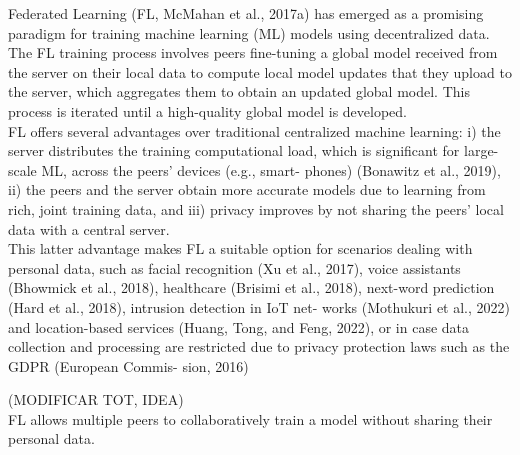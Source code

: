 Federated Learning (FL, McMahan et al., 2017a) has emerged as a promising 
paradigm for training machine learning (ML) models using decentralized data. \\
The FL training process involves peers fine-tuning a global model received from 
the server on their local data to compute local model updates that they upload to the 
server, which aggregates them to obtain an updated global model. This process is iterated 
until a high-quality global model is developed.\\
FL offers several advantages over traditional centralized machine learning: 
i) the server distributes the training computational load, which is significant for 
large-scale ML, across the peers’ devices (e.g., smart- phones) (Bonawitz et al., 2019), 
ii) the peers and the server obtain more accurate models due to learning from rich, joint 
training data, and iii) privacy improves by not sharing the peers’ local data with a 
central server.\\
This latter advantage makes FL a suitable option for scenarios
dealing with personal data, such as facial recognition (Xu et al., 2017), voice assistants
 (Bhowmick et al., 2018), healthcare (Brisimi et al., 2018), next-word prediction 
 (Hard et al., 2018), intrusion detection in IoT net- works (Mothukuri et al., 2022) 
 and location-based services (Huang, Tong, and Feng, 2022), or in case data collection and 
 processing are restricted due to privacy protection laws such as the GDPR 
 (European Commis- sion, 2016)

(MODIFICAR TOT, IDEA)\\

FL allows multiple peers to collaboratively train a model without sharing their 
personal data.

